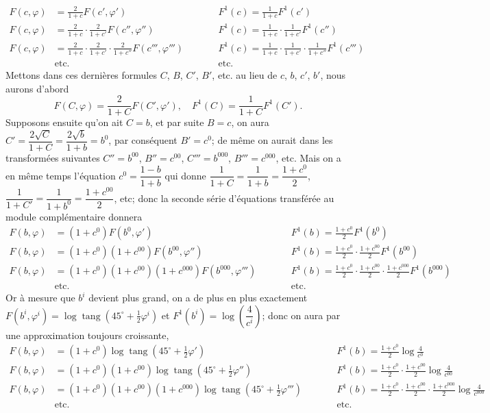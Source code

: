 \documentclass{article}
\begin{document}
\[ \begin{aligned} F(c,\varphi)&=\frac{2}{1+c}F(c',\varphi') &\qquad& F^{1}(c)=\frac{1}{1+c}F^{1}(c')\\ F(c,\varphi)&=\frac{2}{1+c}\cdot\frac{2}{1+c'}F(c'',\varphi'') && F^{1}(c)=\frac{1}{1+c}\cdot\frac{1}{1+c'}F^{1}(c'')\\ F(c,\varphi)&=\frac{2}{1+c}\cdot\frac{2}{1+c'}\cdot\frac{2}{1+c''}F(c''',\varphi''') && F^{1}(c)=\frac{1}{1+c}\cdot\frac{1}{1+c'}\cdot\frac{1}{1+c''}F^{1}(c''')\\ &\text{etc.} && \text{etc.} \end{aligned} \]
Mettons dans ces dernières formules $C$, $B$, $C'$, $B'$, etc. au lieu de $c$, $b$, $c'$, $b'$, nous aurons d'abord
\[ F(C,\varphi)=\frac{2}{1+C}F(C',\varphi'),\quad F^{1}(C)=\frac{1}{1+C}F^{1}(C'). \]
Supposons ensuite qu'on ait $C=b$, et par suite $B=c$, on aura $C'=\dfrac{2\sqrt{C}}{1+C}=\dfrac{2\sqrt{b}}{1+b}=b^{0}$, par conséquent $B'=c^{0}$; de même on aurait dans les transformées suivantes $C''=b^{00}$, $B''=c^{00}$, $C'''=b^{000}$, $B'''=c^{000}$, etc. Mais on a en même temps l'équation $c^{0}=\dfrac{1-b}{1+b}$ qui donne $\dfrac{1}{1+C}=\dfrac{1}{1+b}=\dfrac{1+c^{0}}{2}$, $\dfrac{1}{1+C'}=\dfrac{1}{1+b^{0}}=\dfrac{1+c^{00}}{2}$, etc; donc la seconde série d'équations transférée au module complémentaire donnera
\[ \begin{aligned} F(b,\varphi)&=(1+c^{0})F(b^{0},\varphi') &\qquad& F^{1}(b)=\frac{1+c^{0}}{2}F^{1}(b^{0})\\ F(b,\varphi)&=(1+c^{0})(1+c^{00})F(b^{00},\varphi'') && F^{1}(b)=\frac{1+c^{0}}{2}\cdot\frac{1+c^{00}}{2}F^{1}(b^{00})\\ F(b,\varphi)&=(1+c^{0})(1+c^{00})(1+c^{000})F(b^{000},\varphi''') && F^{1}(b)=\frac{1+c^{0}}{2}\cdot\frac{1+c^{00}}{2}\cdot\frac{1+c^{000}}{2}F^{1}(b^{000})\\ &\text{etc.} && \text{etc.} \end{aligned} \]
Or à mesure que $b^{i}$ devient plus grand, on a de plus en plus exactement $F(b^{i},\varphi^{i})=\log\operatorname{tang}(45^{\circ}+\frac{1}{2}\varphi^{i})$ et $F^{1}(b^{i})=\log\left(\dfrac{4}{c^{i}}\right)$; donc on aura par une approximation toujours croissante,
\[ \begin{aligned} F(b,\varphi)&=(1+c^{0})\log\operatorname{tang}(45^{\circ}+\tfrac{1}{2}\varphi') &\qquad& F^{1}(b)=\frac{1+c^{0}}{2}\log\frac{4}{c^{0}}\\ F(b,\varphi)&=(1+c^{0})(1+c^{00})\log\operatorname{tang}(45^{\circ}+\tfrac{1}{2}\varphi'') && F^{1}(b)=\frac{1+c^{0}}{2}\cdot\frac{1+c^{00}}{2}\log\frac{4}{c^{00}}\\ F(b,\varphi)&=(1+c^{0})(1+c^{00})(1+c^{000})\log\operatorname{tang}(45^{\circ}+\tfrac{1}{2}\varphi''') && F^{1}(b)=\frac{1+c^{0}}{2}\cdot\frac{1+c^{00}}{2}\cdot\frac{1+c^{000}}{2}\log\frac{4}{c^{000}}\\ &\text{etc.} && \text{etc.} \end{aligned} \]
\end{document}
